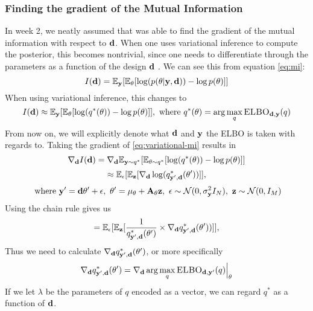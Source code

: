 \subsubsection{Finding the gradient of the Mutual Information}
In week 2, we neatly assumed that  was able to find the gradient 
of the mutual information with respect to $\mathbf{d}$. 
When one uses variational inference to compute the posterior, this becomes nontrivial, since one needs to differentiate through the parameters as a function of the design $\mathbf{d}$ \cite{lorraine19}.
We can see this from equation \ref{eq:mi}:
\begin{equation}I(\mathbf{d}) = \mathbb{E}_{\mathbf{y}}[\mathbb{E}_{\mathbf{\theta}}[\log (p(\theta | \mathbf{y}, \mathbf{d})) - \log p(\theta)]]\end{equation}
When using variational inference, this changes to
\begin{equation}\label{eq:variational-mi}I(\mathbf{d}) \approx \mathbb{E}_{\mathbf{y}}[\mathbb{E}_{\mathbf{\theta}}[\log (q^*(\theta)) - \log p(\theta)]],\ \textrm{where}\ q^*(\theta) = \arg \max_q \textsc{ELBO}_{\mathbf{d}, \mathbf{y}}(q)\end{equation}
From now on, we will explicitly denote what $\mathbf{d}$ and $\mathbf{y}$ the ELBO is taken with regards to.
Taking the gradient of \eqref{eq:variational-mi} results in
\begin{equation}\nabla_{\mathbf{d}} I(\mathbf{d}) = \nabla_{\mathbf{d}}\mathbb{E}_{\mathbf{y} \sim q^*}[\mathbb{E}_{\mathbf{\theta}\sim q^*}[\log (q^*(\theta)) - \log p(\theta)]]\label{eq:var-mi-reparam}\end{equation}
$$ \approx \mathbb{E}_{\mathbf{\epsilon}}[\mathbb{E}_{\mathbf{z}}[\nabla_{\mathbf{d}}\log (q^*_{\mathbf{y}', \mathbf{d}}(\theta'))]],$$
$$\ \textrm{where}\ \mathbf{y}' = \mathbf{d}\theta' + \epsilon,\ \theta' = \mu_\theta + \mathbf{A}_\theta\mathbf{z},\ \epsilon \sim \mathcal{N}(0, \sigma^2_{\mathbf{y}} I_N),\ \mathbf{z} \sim \mathcal{N}(0, I_M)$$
Using the chain rule gives us
\begin{equation}
  = \mathbb{E}_{\mathbf{\epsilon}}[\mathbb{E}_{\mathbf{z}}[\frac{1}{q^*_{\mathbf{y}', \mathbf{d}}(\theta')} \times \nabla_{\mathbf{d}} q^*_{\mathbf{y}', \mathbf{d}}(\theta'))]],
  \label{eq:variational-mi-2}
\end{equation}
Thus we need to calculate $\nabla_{\mathbf{d}} q^*_{\mathbf{y}', \mathbf{d}}(\theta')$, or more specifically
\begin{equation}
\nabla_{\mathbf{d}} q^*_{\mathbf{y}', \mathbf{d}}(\theta') = \nabla_{\mathbf{d}} \arg \max_q \textsc{ELBO}_{\mathbf{d}, \mathbf{y}'}(q)\Bigr\rvert_{\theta}
\end{equation}
If we let $\lambda$ be the parameters of $q$ encoded as a vector, we can regard $q^*$ as a function of $\mathbf{d}$.
